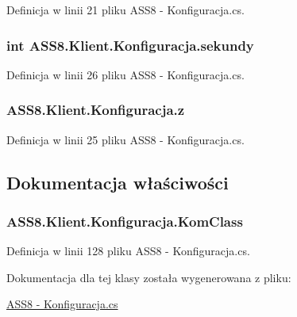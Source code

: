 Definicja w linii 21 pliku ASS8 - Konfiguracja.cs.\hypertarget{a00014_b484254239ce03aa12ad870b9c5454fb}{
\subsubsection[{sekundy}]{\setlength{\rightskip}{0pt plus 5cm}int {\bf ASS8.Klient.Konfiguracja.sekundy}}}
\label{d2/de7/a00014_b484254239ce03aa12ad870b9c5454fb}




Definicja w linii 26 pliku ASS8 - Konfiguracja.cs.\hypertarget{a00014_4a874d85030babce8df85e2dadf9577e}{
\subsubsection[{z}]{ {\bf ASS8.Klient.Konfiguracja.z}}}
\label{d2/de7/a00014_4a874d85030babce8df85e2dadf9577e}




Definicja w linii 25 pliku ASS8 - Konfiguracja.cs.

\subsection{Dokumentacja właściwości}
\hypertarget{a00014_ebc21fd88f797ade28feaaa274769fa8}{
\subsubsection[{KomClass}]{ ASS8.Klient.Konfiguracja.KomClass}}
\label{d2/de7/a00014_ebc21fd88f797ade28feaaa274769fa8}




Definicja w linii 128 pliku ASS8 - Konfiguracja.cs.

Dokumentacja dla tej klasy została wygenerowana z pliku:\begin{CompactItemize}
\item 
\hyperlink{a00038}{ASS8 - Konfiguracja.cs}\end{CompactItemize}
